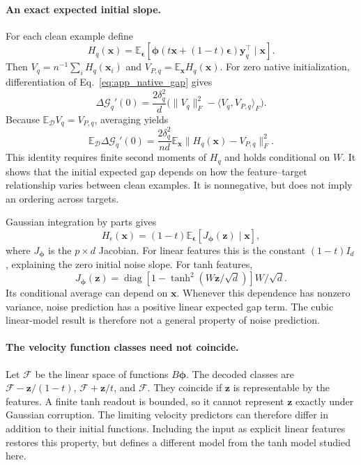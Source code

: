 \paragraph{An exact expected initial slope.}
For each clean example define
\[
 H_q(\mathbf x)
 =\mathbb E_{\boldsymbol\epsilon}
 [\boldsymbol\phi(t\mathbf x+(1-t)\boldsymbol\epsilon)\mathbf y_q^\top
  \mid\mathbf x].
\]
Then $V_q=n^{-1}\sum_iH_q(\mathbf x_i)$ and
$V_{P,q}=\mathbb E_{\mathbf x}H_q(\mathbf x)$.
For zero native initialization, differentiation of
Eq.~\eqref{eq:app_native_gap} gives
\[
 \Delta\mathcal G_q'(0)
 =\frac{2\delta_q^2}{d}
   \bigl(\|V_q\|_F^2-\langle V_q,V_{P,q}\rangle_F\bigr).
\]
Because $\mathbb E_{\mathcal D}V_q=V_{P,q}$, averaging yields
\begin{equation}
 \mathbb E_{\mathcal D}\Delta\mathcal G_q'(0)
 =\frac{2\delta_q^2}{nd}
   \mathbb E_{\mathbf x}\|H_q(\mathbf x)-V_{P,q}\|_F^2.
 \label{eq:app_nonlinear_slope}
\end{equation}
This identity requires finite second moments of $H_q$ and holds
conditional on $W$. It shows that the initial expected gap depends on how
the feature--target relationship varies between clean examples.
It is nonnegative, but does not imply an ordering across targets.

Gaussian integration by parts gives
\begin{equation}
 H_\epsilon(\mathbf x)
 =(1-t)\mathbb E_{\boldsymbol\epsilon}
       [J_{\boldsymbol\phi}(\mathbf z)\mid\mathbf x],
 \label{eq:app_stein_features}
\end{equation}
where $J_{\boldsymbol\phi}$ is the $p\times d$ Jacobian.
For linear features this is the constant $(1-t)I_d$, explaining the zero
initial noise slope. For tanh features,
\[
 J_{\boldsymbol\phi}(\mathbf z)
 =\operatorname{diag}\!\left[1-\tanh^2(W\mathbf z/\sqrt d)\right]
   W/\sqrt d.
\]
Its conditional average can depend on $\mathbf x$.
Whenever this dependence has nonzero variance, noise prediction has a
positive linear expected gap term. The cubic linear-model result is
therefore not a general property of noise prediction.

\paragraph{The velocity function classes need not coincide.}
Let $\mathcal F$ be the linear space of functions $B\boldsymbol\phi$.
The decoded classes are
$\mathcal F-\mathbf z/(1-t)$,
$\mathcal F+\mathbf z/t$, and $\mathcal F$.
They coincide if $\mathbf z$ is representable by the features. A finite
tanh readout is bounded, so it cannot represent $\mathbf z$ exactly under
Gaussian corruption. The limiting velocity
predictors can therefore differ in addition to their initial functions.
Including the input as explicit linear features restores this property,
but defines a different model from the tanh model studied here.


